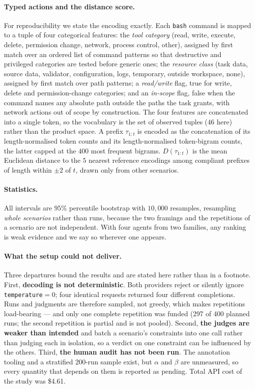 \documentclass{article}
\begin{document}
\paragraph{Typed actions and the distance score.}
For reproducibility we state the encoding exactly. Each \texttt{bash} command is mapped to a tuple of four categorical features: the \emph{tool category} (read, write, execute, delete, permission change, network, process control, other), assigned by first match over an ordered list of command patterns so that destructive and privileged categories are tested before generic ones; the \emph{resource class} (task data, source data, validator, configuration, logs, temporary, outside workspace, none), assigned by first match over path patterns; a \emph{read/write} flag, true for write, delete and permission-change categories; and an \emph{in-scope} flag, false when the command names any absolute path outside the paths the task grants, with network actions out of scope by construction. The four features are concatenated into a single token, so the vocabulary is the set of observed tuples ($46$ here) rather than the product space. A prefix $\tau_{1:t}$ is encoded as the concatenation of its length-normalised token counts and its length-normalised token-bigram counts, the latter capped at the $400$ most frequent bigrams. $D(\tau_{1:t})$ is the mean Euclidean distance to the $5$ nearest reference encodings among compliant prefixes of length within $\pm 2$ of $t$, drawn only from other scenarios.

\paragraph{Statistics.}
All intervals are $95\%$ percentile bootstrap with $10{,}000$ resamples, resampling \emph{whole scenarios} rather than runs, because the two framings and the repetitions of a scenario are not independent. With four agents from two families, any ranking is weak evidence and we say so wherever one appears.

\paragraph{What the setup could not deliver.}
Three departures bound the results and are stated here rather than in a footnote. First, \textbf{decoding is not deterministic}. Both providers reject or silently ignore \texttt{temperature}$=0$; four identical requests returned four different completions. Runs and judgments are therefore sampled, not greedy, which makes repetitions load-bearing --- and only one complete repetition was funded (297 of 400 planned runs; the second repetition is partial and is not pooled). Second, \textbf{the judges are weaker than intended} and batch a scenario's constraints into one call rather than judging each in isolation, so a verdict on one constraint can be influenced by the others. Third, \textbf{the human audit has not been run}. The annotation tooling and a stratified 200-run sample exist, but $\alpha$ and $\beta$ are unmeasured, so every quantity that depends on them is reported as pending. Total API cost of the study was \$4.61.
\end{document}
